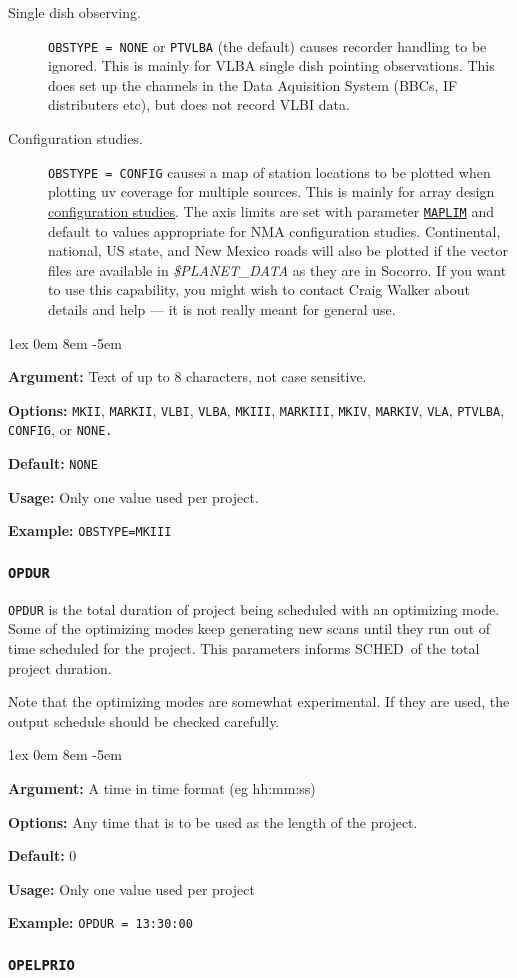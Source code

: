\documentclass{report}
\newcommand{\schedb}{{\sc SCHED~}}
\newcommand{\rcwbox}[5]{
  \begin{list}{}{\parsep 1ex  \itemsep 0em
                 \leftmargin 8em  \itemindent -5em }
    \item {\bf Argument:} #1
    \item {\bf Options:}  #2
    \item {\bf Default:}  #3
    \item {\bf Usage:}    #4
    \item {\bf Example:}  #5
  \end{list}
}
\begin{document}
\begin{description}
\item[Single dish observing.]  {\tt OBSTYPE = NONE} or {\tt PTVLBA}
(the default) causes recorder handling to be ignored. This is mainly for
VLBA single dish pointing observations.  This does set up the channels
in the Data Aquisition System (BBCs, IF distributers etc), but does
not record VLBI data.

\item[Configuration studies.]  {\tt OBSTYPE = CONFIG} causes a map
of station locations to be plotted when plotting uv coverage for
multiple sources.  This is mainly for array design
{\hyperref[SEC:CONFIG]{configuration studies}}.
The axis limits are set with parameter
{\hyperref[MP:MAPLIM]{{\tt MAPLIM}}} and default to values appropriate
for NMA configuration studies.  Continental, national, US state,
and New Mexico roads will also be plotted if the vector files are
available in {\sl \$PLANET\_DATA} as they are in Socorro.  If you want
to use this capability, you might wish to contact Craig Walker
about details and help --- it is not really meant for general use.

\end{description}

\rcwbox
{Text of up to 8 characters, not case sensitive.}
{{\tt MKII}, {\tt MARKII}, {\tt VLBI}, {\tt VLBA}, {\tt MKIII},
{\tt MARKIII}, {\tt MKIV}, {\tt MARKIV}, {\tt VLA}, {\tt PTVLBA},
{\tt CONFIG}, or {\tt NONE.}}
{\tt NONE}
{Only one value used per project.}
{{\tt OBSTYPE=MKIII}}


\subsubsection{\label{MP:OPDUR}{\tt OPDUR}}

{\tt OPDUR} is the total duration of project being scheduled with an
optimizing mode.  Some of the optimizing modes keep generating new scans
until they run out of time scheduled for the project.  This parameters
informs \schedb of the total project duration.

Note that the optimizing modes are somewhat experimental.  If they are used,
the output schedule should be checked carefully.

\rcwbox
{A time in time format (eg hh:mm:ss)}
{Any time that is to be used as the length of the project.}
{0}
{Only one value used per project}
{{\tt OPDUR = 13:30:00}}

\subsubsection{\label{MP:OPELPRIO}{\tt OPELPRIO}}
\end{document}
